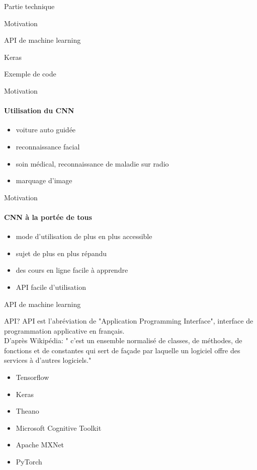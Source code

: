 \documentclass{beamer}
\begin{document}
\begin{frame}{Partie technique}
    \item Motivation
    \item API de machine learning
    \item Keras
    \item Exemple de code
\end{frame}
\begin{frame}{Motivation}
    \framesubtitle{Utilisation du CNN}
        \begin{itemize}
            \item voiture auto guidée
            \item reconnaissance facial
            \item soin médical, reconnaissance de maladie sur radio
            \item marquage d'image
        \end{itemize}
\end{frame}
\begin{frame}{Motivation}
\framesubtitle{CNN à la portée de tous}
    \begin{itemize}
        \item mode d'utilisation de plus en plus accessible
        \item sujet de plus en plus répandu 
        \item des cours en ligne facile à apprendre
        \item API facile d'utilisation 
    \end{itemize}
\end{frame}
\begin{frame}{API de machine learning}
    \begin{block}{API?}
        API est l'abréviation de "Application Programming Interface", interface de programmation applicative en français. \\
        D'après Wikipédia: " c'est un ensemble normalisé de classes, de méthodes, de fonctions et de constantes qui sert de façade par laquelle un logiciel offre des services à d'autres logiciels." 
    \end{block}
    \begin{itemize}
        \item Tensorflow
        \item Keras
        \item Theano
        \item Microsoft Cognitive Toolkit
        \item Apache MXNet
        \item PyTorch
    \end{itemize}
\end{frame}
\end{document}
